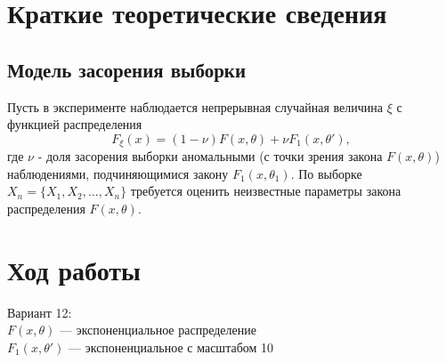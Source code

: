 \documentclass[a4paper,12pt]{article}
\begin{document}
\section{Краткие теоретические сведения}

\subsection{Модель засорения выборки}

Пусть в эксперименте наблюдается
непрерывная случайная величина $\xi$ с функцией распределения
\[
	F_{\xi}(x) = (1 - \nu) F(x, \theta) + \nu F_1 (x , \theta'),
\]
где $\nu$ - доля засорения выборки аномальными (с точки зрения закона $F(x,
\theta)$) наблюдениями, подчиняющимися закону $F_1(x, \theta_1)$. По выборке
${X_n = \{X_1, X_2, \ldots, X_n\}}$ требуется оценить неизвестные параметры
закона распределения $F(x, \theta)$.

\section{Ход работы}

Вариант 12: \\
$F(x, \theta)$ --- экспоненциальное распределение\\
$F_{1}(x, \theta')$ --- экспоненциальное с масштабом 10
\end{document}
